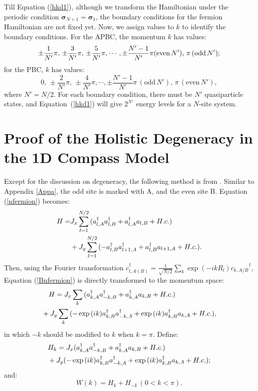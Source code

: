 \documentclass[twocolumn,floats,superscriptaddress]{revtex4}
\begin{document}
Till Equation (\ref{hkd1}), although we transform the Hamiltonian under the periodic condition $\bm{\sigma}_{N+1}=\bm{\sigma}_1$, the boundary conditions for the fermion Hamiltonian are not fixed yet. Now, we assign values to $k$ to {identify} the boundary conditions. For the APBC, the momentum $k$ has values:
\begin{equation}\label{kapbc}
\pm \frac{1}{N'}\pi,\, \pm \frac{3}{N'}\pi,\, \pm \frac{5}{N'}\pi,\cdots,\pm \frac{N'-1}{N'}\pi (\text{even}\,N'),\,
 \pi \,(\text{odd}\, N');\notag
\end{equation}
for the PBC, $k$ has values:
\begin{equation}\label{kpbc}
0,\,\pm \frac{2}{N'}\pi,\, \pm \frac{4}{N'}\pi
,\cdots,\pm \frac{N'-1}{N'}\pi\,(\text{odd}\, N'),\,
 \pi \,(\text{even}\, N'),
\end{equation}
where $N'=N/2$. For each boundary condition, there must be $N'$ quasiparticle states, and Equation~(\ref{hkd1}) will give $2^{N'}$ energy levels for a $N$-site system.

\section{Proof of the {Holistic Degeneracy} in the 1D Compass Model}\label{Appb}
Except for the discussion on degeneracy, the following method is {from} \cite{Sun2009}. Similar to Appendix \ref{Appa}, the odd site is marked {with} A, and the even site B. Equation (\ref{nfermion}) becomes:
\begin{align}\label{Bnfermion}
H=&J_x\sum_{l=1}^{N/2}{(a_{l,A}^{\dag}a_{l,B}^\dag+a_{l,A}^{\dag}a_{l,B}+H.c.)}\notag
\\
&+J_y\sum_{l=1}^{N/2}{(-a_{l,B}^{\dag}a_{l+1,A}^\dag+a_{l,B}^{\dag}a_{l+1,A}+H.c.)}. %
\end{align}
Then, using the Fourier transformation $c_{l, A(B)}^\dag=\frac{1}{\sqrt {N/2}}\sum_k{\exp{(-ikR_l)}c_{k,A/B}}^\dag$, Equation (\ref{Bnfermion}) is directly transformed to the momentum space:
\begin{align}\label{Bnfermionk}
&\quad H=J_x\sum_{k}{(a_{k,A}^{\dag}a_{-k,B}^\dag+a_{k,A}^{\dag}a_{k,B}+H.c.)}\notag
\\
&+J_y\sum_{k}{(-\exp{(ik)}a_{k,B}^{\dag}a_{-k,A}^\dag+\exp{(ik)}a_{k,B}^{\dag}a_{k,A}+H.c.)}, %
\end{align}
in which $-k$ should be modified to $k$ when $k=\pi$.
Define:
\begin{align}\label{Bhk}
&H_k =J_x(a_{k,A}^{\dag}a_{-k,B}^\dag+a_{k,A}^{\dag}a_{k,B}+H.c.)\notag
\\
&+J_y(-\exp{(ik)}a_{k,B}^{\dag}a_{-k,A}^\dag+\exp{(ik)}a_{k,B}^{\dag}a_{k,A}+H.c.); %
\end{align}
and:
\begin{equation}\label{Wk}
W(k)=H_k+H_{-k}\, (0<k<\pi).
\end{equation}
\end{document}
